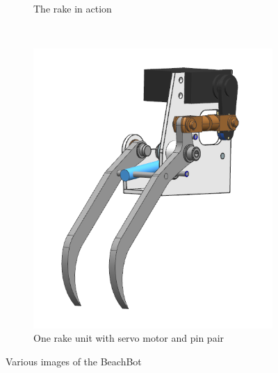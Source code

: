 \begin{figure}
\begin{subfigure}[c]{0.46\textwidth}
\caption{The rake in action}
\end{subfigure}
~~
\begin{subfigure}[c]{0.3\textwidth}
\includegraphics[width=\textwidth]{images/introduction/rake_pins.png}
\caption{One rake unit with servo motor and pin pair}
\end{subfigure}
\caption{Various images of the BeachBot}
\label{fig:beachbot}
\end{figure} 
